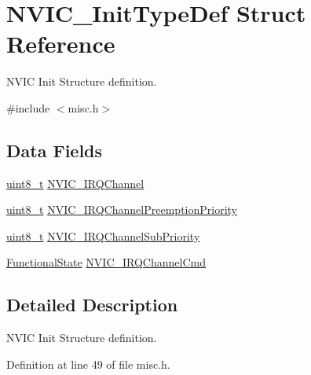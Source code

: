 \hypertarget{struct_n_v_i_c___init_type_def}{\section{N\-V\-I\-C\-\_\-\-Init\-Type\-Def Struct Reference}
\label{struct_n_v_i_c___init_type_def}
}


N\-V\-I\-C Init Structure definition.  




{\ttfamily \#include $<$misc.\-h$>$}

\subsection*{Data Fields}
\begin{DoxyCompactItemize}
\item 
\hyperlink{stdint_8h_aba7bc1797add20fe3efdf37ced1182c5}{uint8\-\_\-t} \hyperlink{struct_n_v_i_c___init_type_def_afa04cf6e559bb690bdd9fcb7e3d93dcf}{N\-V\-I\-C\-\_\-\-I\-R\-Q\-Channel}
\item 
\hyperlink{stdint_8h_aba7bc1797add20fe3efdf37ced1182c5}{uint8\-\_\-t} \hyperlink{struct_n_v_i_c___init_type_def_aa3fe262c30188404a6e31f922c5ae513}{N\-V\-I\-C\-\_\-\-I\-R\-Q\-Channel\-Preemption\-Priority}
\item 
\hyperlink{stdint_8h_aba7bc1797add20fe3efdf37ced1182c5}{uint8\-\_\-t} \hyperlink{struct_n_v_i_c___init_type_def_aecc22a002244e3f1f9448dbe46c1db4b}{N\-V\-I\-C\-\_\-\-I\-R\-Q\-Channel\-Sub\-Priority}
\item 
\hyperlink{group___exported__types_gac9a7e9a35d2513ec15c3b537aaa4fba1}{Functional\-State} \hyperlink{struct_n_v_i_c___init_type_def_acb23fabb995fa4980c768825f12f5815}{N\-V\-I\-C\-\_\-\-I\-R\-Q\-Channel\-Cmd}
\end{DoxyCompactItemize}


\subsection{Detailed Description}
N\-V\-I\-C Init Structure definition. 

Definition at line 49 of file misc.\-h.



